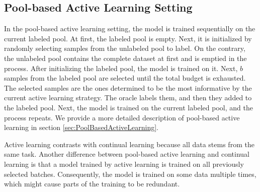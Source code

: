 \subsection{Pool-based Active Learning Setting}
\label{sec:Methodology:ALSetting}
In the pool-based active learning setting, the model is trained sequentially on the current labeled pool. At first, the labeled pool is empty. Next, it is
initialized by randomly selecting samples from the unlabeled pool to label. On the contrary, the unlabeled pool contains the complete dataset at first and
is emptied in the process. After initializing the labeled pool, the model is trained on it. Next, $b$ samples from the labeled pool are selected until the
total budget is exhausted. The selected samples are the ones determined to be the most informative by the current active learning strategy. The oracle labels
them, and then they added to the labeled pool. Next, the model is trained on the current labeled pool, and the process repeats. We provide a more detailed
description of pool-based active learning in section \ref{sec:PoolBasedActiveLearning}. \par
Active learning contrasts with continual learning because all data stems from the same task. Another difference between pool-based active learning and
continual learning is that a model trained by active learning is trained on all previously selected batches. Consequently, the model is trained on some
data multiple times, which might cause parts of the training to be redundant.

